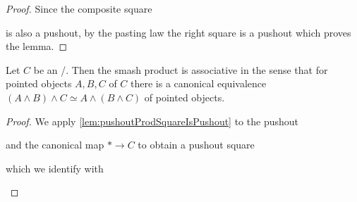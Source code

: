 \begin{lemma}
\begin{proof}
        Since the composite square
        \begin{center}
        \end{center}
        is also a pushout, by the pasting law the right square is a pushout which proves the lemma.
    \end{proof}
\end{lemma}
\begin{lemma}\label{lem:assocSmash}
    Let $C$ be an \inftytop/.
    Then the smash product is associative in the sense that for pointed objects $A,B,C$ of $C$ there is a canonical equivalence $(A\wedge B)\wedge C\simeq A\wedge (B\wedge C)$ of pointed objects.
    \begin{proof}
        We apply \cref{lem:pushoutProdSquareIsPushout} to the pushout
        \begin{center}
        \end{center} 
        and the canonical map $*\to C$ to obtain a pushout square
        \begin{center}
        \end{center}
        which we identify with
        \begin{center}
\end{center}
\end{proof}
\end{lemma}
